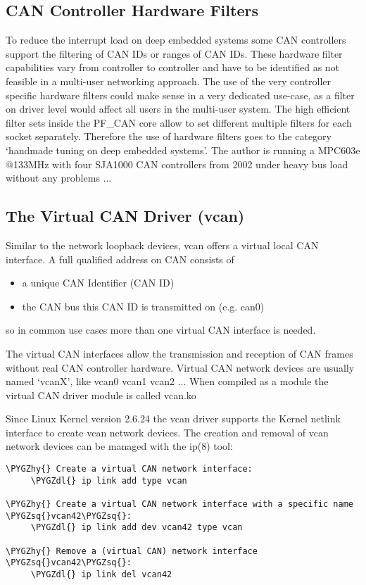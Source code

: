 \documentclass[a4paper,8pt,english]{sphinxmanual}
\def\PYGZdl{\char`\$}
\def\PYGZhy{\char`\-}
\def\PYGZsq{\char`\'}
\renewcommand\PYGZsq{\textquotesingle}
\begin{document}
\subsection{CAN Controller Hardware Filters}
\label{networking/can:can-controller-hardware-filters}
To reduce the interrupt load on deep embedded systems some CAN
controllers support the filtering of CAN IDs or ranges of CAN IDs.
These hardware filter capabilities vary from controller to
controller and have to be identified as not feasible in a multi-user
networking approach. The use of the very controller specific
hardware filters could make sense in a very dedicated use-case, as a
filter on driver level would affect all users in the multi-user
system. The high efficient filter sets inside the PF\_CAN core allow
to set different multiple filters for each socket separately.
Therefore the use of hardware filters goes to the category `handmade
tuning on deep embedded systems'. The author is running a MPC603e
@133MHz with four SJA1000 CAN controllers from 2002 under heavy bus
load without any problems ...


\subsection{The Virtual CAN Driver (vcan)}
\label{networking/can:the-virtual-can-driver-vcan}
Similar to the network loopback devices, vcan offers a virtual local
CAN interface. A full qualified address on CAN consists of
\begin{itemize}
\item {} 
a unique CAN Identifier (CAN ID)

\item {} 
the CAN bus this CAN ID is transmitted on (e.g. can0)

\end{itemize}

so in common use cases more than one virtual CAN interface is needed.

The virtual CAN interfaces allow the transmission and reception of CAN
frames without real CAN controller hardware. Virtual CAN network
devices are usually named `vcanX', like vcan0 vcan1 vcan2 ...
When compiled as a module the virtual CAN driver module is called vcan.ko

Since Linux Kernel version 2.6.24 the vcan driver supports the Kernel
netlink interface to create vcan network devices. The creation and
removal of vcan network devices can be managed with the ip(8) tool:

\begin{Verbatim}[commandchars=\\\{\}]
\PYGZhy{} Create a virtual CAN network interface:
     \PYGZdl{} ip link add type vcan

\PYGZhy{} Create a virtual CAN network interface with a specific name \PYGZsq{}vcan42\PYGZsq{}:
     \PYGZdl{} ip link add dev vcan42 type vcan

\PYGZhy{} Remove a (virtual CAN) network interface \PYGZsq{}vcan42\PYGZsq{}:
     \PYGZdl{} ip link del vcan42
\end{Verbatim}
\end{document}
